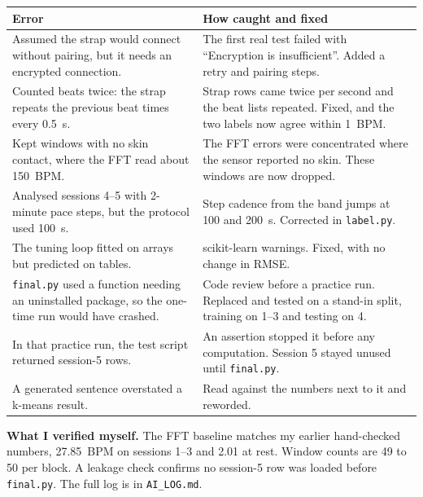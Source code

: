 \documentclass[conference]{IEEEtran}
\newcommand{\tsmall}{\footnotesize\setlength{\tabcolsep}{3.5pt}}
\begin{document}
\smallskip
{\tsmall
\begin{tabular}{@{}p{}p{}@{}}
\toprule
Error & How caught and fixed \\
\midrule
Assumed the strap would connect without pairing, but it needs an encrypted connection. & The first real test failed with ``Encryption is insufficient''. Added a retry and pairing steps. \\
Counted beats twice: the strap repeats the previous beat times every 0.5~s. & Strap rows came twice per second and the beat lists repeated. Fixed, and the two labels now agree within 1~BPM. \\
Kept windows with no skin contact, where the FFT read about 150~BPM. & The FFT errors were concentrated where the sensor reported no skin. These windows are now dropped. \\
Analysed sessions 4--5 with 2-minute pace steps, but the protocol used 100~s. & Step cadence from the band jumps at 100 and 200~s. Corrected in \texttt{label.py}. \\
The tuning loop fitted on arrays but predicted on tables. & scikit-learn warnings. Fixed, with no change in RMSE. \\
\texttt{final.py} used a function needing an uninstalled package, so the one-time run would have crashed. & Code review before a practice run. Replaced and tested on a stand-in split, training on 1--3 and testing on 4. \\
In that practice run, the test script returned session-5 rows. & An assertion stopped it before any computation. Session 5 stayed unused until \texttt{final.py}. \\
A generated sentence overstated a k-means result. & Read against the numbers next to it and reworded. \\
\bottomrule
\end{tabular}}

\smallskip
\textbf{What I verified myself.} The FFT baseline matches my earlier hand-checked numbers, 27.85~BPM on sessions 1--3 and 2.01 at rest. Window counts are 49 to 50 per block. A leakage check confirms no session-5 row was loaded before \texttt{final.py}. The full log is in \texttt{AI\_LOG.md}.
\end{document}
